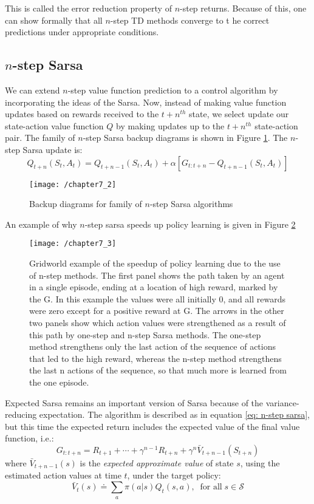 This is called the error reduction property of $n$-step returns. Because of this, one can show formally that all $n$-step TD methods converge to t he correct predictions under appropriate conditions.

\subsection{$n$-step Sarsa}
We can extend $n$-step value function prediction to a control algorithm by incorporating the ideas of the Sarsa. Now, instead of making value function updates based on rewards received to the $t+n^{th}$ state, we select update our state-action value function $Q$ by making updates up to the $t+n^{th}$ state-action pair. The family of $n$-step Sarsa backup diagrams is shown in Figure \ref{fig: n-step sarsa methods}. The $n$-step Sarsa update is:
\begin{equation} \label{eq: n-step sarsa}
Q_{t+n}(S_t, A_t) = Q_{t+n-1}(S_t, A_t) + \alpha \left[G_{t:t+n} - Q_{t+n-1}(S_t, A_t)\right]
\end{equation}

\begin{figure}[h!]
	\centering
	\texttt{[image: /chapter7\_2]}
	\caption{Backup diagrams for family of $n$-step Sarsa algorithms}
	\label{fig: n-step sarsa methods}
\end{figure}

An example of why $n$-step sarsa speeds up policy learning is given in Figure \ref{fig: n-step sarsa speed up}
\begin{figure}
	\centering
	\texttt{[image: /chapter7\_3]}
	\caption{Gridworld example of the speedup of policy learning due to the use of n-step methods. The first panel shows the path taken by an agent in a single episode, ending at a location of high reward, marked by the G. In this example the values were all initially 0, and all rewards were zero except for a positive reward at G. The arrows in the other two panels show which action values were strengthened as a result of this path by one-step and n-step Sarsa methods. The one-step method strengthens only the last action of the sequence of actions that led to the high reward, whereas the n-step method strengthens the last n actions of the sequence, so that much more is learned from the one episode.}
	\label{fig: n-step sarsa speed up}
\end{figure}

Expected Sarsa remains an important version of Sarsa because of the variance-reducing expectation. The algorithm is described as in equation \ref{eq: n-step sarsa}, but this time the expected return includes the expected value of the final value function, i.e.:
\begin{equation}
G_{t:t+n} = R_{t+1} + \cdots + \gamma^{n-1}R_{t+n} + \gamma^n \bar{V}_{t+n-1}(S_{t+n})
\end{equation}
where $\bar{V}_{t+n-1}(s)$ is the \textit{expected approximate value} of state $s$, using the estimated action values at time $t$, under the target policy:
\begin{equation}
\bar{V}_{t}(s) \doteq \sum_{a} \pi(a|s) Q_t(s,a), \; \; \text{for all} \; s \in \mathcal{S}
\end{equation}

